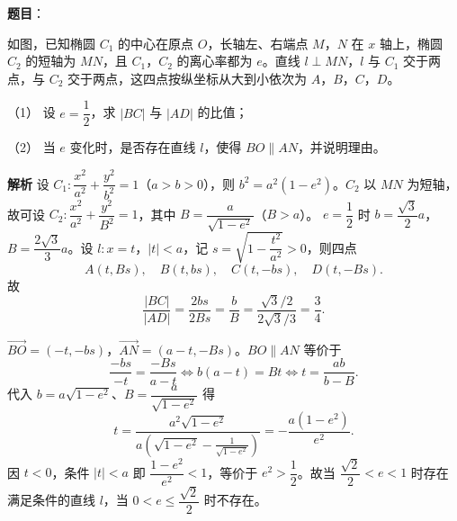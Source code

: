 \begin{answer}


\end{answer}
\begin{answer}

\textbf{题目}：

如图，已知椭圆 $C_1$ 的中心在原点 $O$，长轴左、右端点 $M$，$N$ 在 $x$ 轴上，椭圆 $C_2$ 的短轴为 $MN$，且 $C_1$，$C_2$ 的离心率都为 $e$。直线 $l\perp MN$，$l$ 与 $C_1$ 交于两点，与 $C_2$ 交于两点，这四点按纵坐标从大到小依次为 $A$，$B$，$C$，$D$。

（1） 设 $e=\dfrac12$，求 $|BC|$ 与 $|AD|$ 的比值；

（2） 当 $e$ 变化时，是否存在直线 $l$，使得 $BO\parallel AN$，并说明理由。
\nopagebreak[4]
\begin{center}\end{center}
\nopagebreak[4]
\textbf{解析}
设 $C_1:\dfrac{x^2}{a^2}+\dfrac{y^2}{b^2}=1$（$a>b>0$），则 $b^2=a^2(1-e^2)$。$C_2$ 以 $MN$ 为短轴，故可设 $C_2:\dfrac{x^2}{a^2}+\dfrac{y^2}{B^2}=1$，其中 $B=\dfrac a{\sqrt{1-e^2}}$（$B>a$）。
$e=\dfrac12$ 时 $b=\dfrac{\sqrt3}2a$，$B=\dfrac{2\sqrt3}3a$。设 $l:x=t$，$|t|<a$，记 $s=\sqrt{1-\dfrac{t^2}{a^2}}>0$，则四点
\nopagebreak[4]
\[A(t,Bs),\quad B(t,bs),\quad C(t,-bs),\quad D(t,-Bs).\]
故
\nopagebreak[4]
\[\frac{|BC|}{|AD|}=\frac{2bs}{2Bs}=\frac bB=\frac{\sqrt3/2}{2\sqrt3/3}=\frac34.\]

$\overrightarrow{BO}=(-t,-bs)$，$\overrightarrow{AN}=(a-t,-Bs)$。$BO\parallel AN$ 等价于
\nopagebreak[4]
\[\frac{-bs}{-t}=\frac{-Bs}{a-t}\Longleftrightarrow b(a-t)=Bt\Longleftrightarrow t=\frac{ab}{b-B}.\]
代入 $b=a\sqrt{1-e^2}$、$B=\dfrac a{\sqrt{1-e^2}}$ 得
\nopagebreak[4]
\[t=\frac{a^2\sqrt{1-e^2}}{a\left(\sqrt{1-e^2}-\frac1{\sqrt{1-e^2}}\right)}=-\frac{a(1-e^2)}{e^2}.\]
因 $t<0$，条件 $|t|<a$ 即 $\dfrac{1-e^2}{e^2}<1$，等价于 $e^2>\dfrac12$。故当 $\dfrac{\sqrt2}2<e<1$ 时存在满足条件的直线 $l$，当 $0<e\leqslant\dfrac{\sqrt2}2$ 时不存在。



\end{answer}
